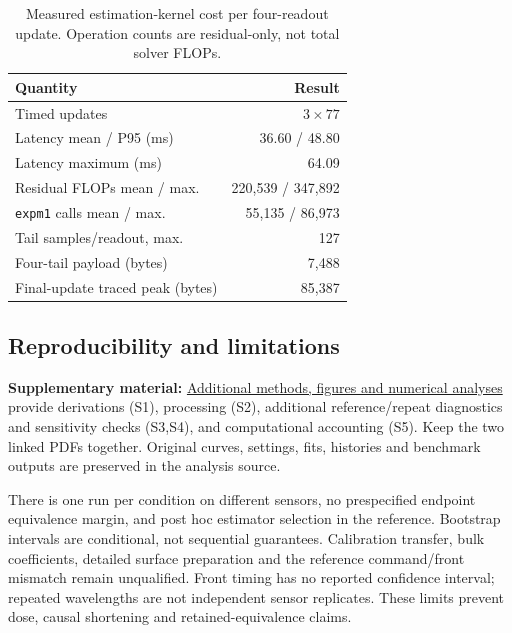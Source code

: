 \documentclass[lettersize,journal]{IEEEtran}
\begin{document}
\begin{table}[t]\centering\small
\caption{Measured estimation-kernel cost per four-readout update.
Operation counts are residual-only, not total solver FLOPs.}
\label{tab:runtime}
\setlength{\tabcolsep}{3pt}
\begin{tabular}{lr}\toprule
Quantity & Result\\\midrule
Timed updates & $3\times77$\\
Latency mean / P95 (ms) & 36.60 / 48.80\\
Latency maximum (ms) & 64.09\\
Residual FLOPs mean / max. & 220,539 / 347,892\\
\texttt{expm1} calls mean / max. & 55,135 / 86,973\\
Tail samples/readout, max. & 127\\
Four-tail payload (bytes) & 7,488\\
Final-update traced peak (bytes) & 85,387\\\bottomrule
\end{tabular}
\end{table}

\subsection{Reproducibility and limitations}
\textbf{Supplementary material:}
\href{SPR_smart_stop_supplement.pdf}{Additional methods, figures and numerical analyses}
provide derivations (S1), processing (S2), additional reference/repeat
diagnostics and sensitivity checks (S3,S4), and computational accounting
(S5). Keep the two linked PDFs together. Original curves, settings, fits,
histories and benchmark outputs are preserved in the analysis source.

There is one run per condition on different sensors, no prespecified
endpoint equivalence margin, and post hoc estimator selection in the
reference. Bootstrap intervals are conditional, not sequential guarantees.
Calibration transfer, bulk coefficients, detailed surface preparation and
the reference command/front mismatch remain unqualified. Front timing has
no reported confidence interval; repeated wavelengths are not independent
sensor replicates. These limits prevent dose, causal shortening and
retained-equivalence claims.
\end{document}
